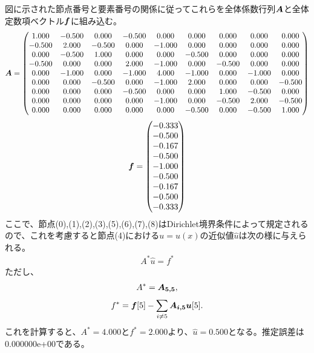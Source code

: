 \documentclass[a4paper,11pt]{jsarticle}
\begin{document}
図に示された節点番号と要素番号の関係に従ってこれらを全体係数行列\(\vb*{A}\)と全体定数項ベクトル\(\vb*{f}\)に組み込む。
\begin{align}
  \vb*{A} = 
  \mqty(
     1.000 &-0.500 & 0.000 &-0.500 & 0.000 & 0.000 & 0.000 & 0.000 & 0.000 \\
    -0.500 & 2.000 &-0.500 & 0.000 &-1.000 & 0.000 & 0.000 & 0.000 & 0.000 \\
     0.000 &-0.500 & 1.000 & 0.000 & 0.000 &-0.500 & 0.000 & 0.000 & 0.000 \\
    -0.500 & 0.000 & 0.000 & 2.000 &-1.000 & 0.000 &-0.500 &  0.000 & 0.000 \\
     0.000 &-1.000 & 0.000 &-1.000 & 4.000 & -1.000 & 0.000 & -1.000 & 0.000 \\
     0.000 & 0.000 &-0.500 & 0.000 &-1.000 & 2.000 & 0.000 & 0.000 &-0.500 \\
     0.000 & 0.000 & 0.000 &-0.500 & 0.000 & 0.000 & 1.000 &-0.500 & 0.000 \\
     0.000 & 0.000 & 0.000 & 0.000 &-1.000 & 0.000 &-0.500 & 2.000 &-0.500 \\
     0.000 & 0.000 & 0.000 & 0.000 & 0.000 &-0.500 & 0.000 &-0.500 & 1.000 \\
  )
\end{align}
\begin{align}
  \vb*{f} = \mqty(-0.333 \\ -0.500 \\ -0.167 \\ -0.500 \\ -1.000 \\ -0.500 \\ -0.167 \\ -0.500 \\ -0.333)
\end{align}
ここで、節点(0),(1),(2),(3),(5),(6),(7),(8)はDirichlet境界条件によって規定されるので、これを考慮すると節点(4)における\(u=u(x)\)の近似値\(\hat{u}\)は次の様に与えられる。
\begin{align}
  A^{*}\hat{u}=f^{*}
\end{align}
ただし、
\begin{align}
  A^{*} = \vb*{A_{5,5}},
\end{align}
\begin{align}
  f^{*} = \vb*{f}[5] - \sum_{i\neq5} \vb*{A_{i,5}}\vb*{u}[5].
\end{align}
これを計算すると、\(A^{*}=4.000\)と\(f^{*}=2.000\)より、\(\hat{u}=0.500\)となる。推定誤差は0.000000e+00である。
\end{document}
